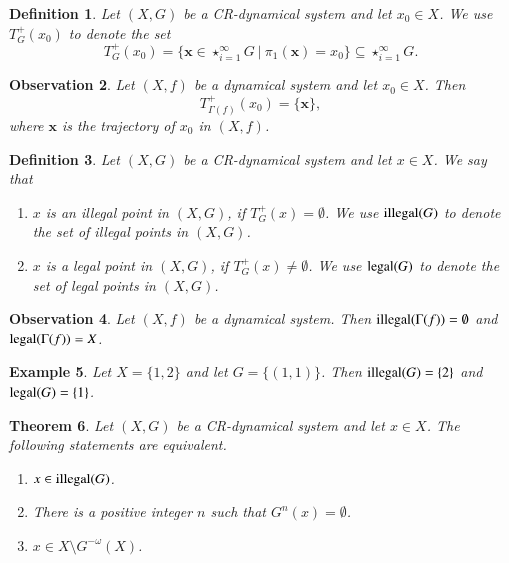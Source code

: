 \documentclass[a4paper,12pt]{article} %
\newcommand{\illegal}{\textup{illegal}}
\newcommand{\legal}{\textup{legal}}
\newtheorem{theorem}{Theorem}[section]
\newtheorem{definition}[theorem]{Definition}
\newtheorem{example}[theorem]{Example}
\newtheorem{observation}[theorem]{Observation}
\begin{document}
\begin{definition}
Let $(X,G)$ be a CR-dynamical system and let $x_0\in X$. We use \emph{ \color{blue}  $T_G^{+}(x_0)$} to denote the set 
$$
T_G^{+}(x_0)=\{\mathbf x\in \star_{i=1}^{\infty}G \ | \  \pi_1(\mathbf x)=x_0\}\subseteq \star_{i=1}^{\infty}G.
$$
\end{definition}
\begin{observation}
Let $(X,f)$ be a dynamical system and let $x_0\in X$.  Then
$$
T_{\Gamma(f)}^{+}(x_0) =\{\mathbf x\},
$$
where $\mathbf x$ is the trajectory of $x_0$ in $(X,f)$.
\end{observation}
\begin{definition}
Let $(X,G)$ be a CR-dynamical system and let $x\in X$. We say that
\begin{enumerate}
\item $x$ is \emph{\color{blue} an illegal point in $(X,G)$}, if $T_G^{+}(x)=\emptyset$. We use 
\emph{\color{blue}$\illegal(G)$} to denote the set of illegal points in $(X,G)$.
\item $x$ is \emph{\color{blue} a legal point in $(X,G)$}, if $T_G^{+}(x)\neq \emptyset$. We use 
\emph{\color{blue}$\legal(G)$} to denote the set of legal points in $(X,G)$.
\end{enumerate}
\end{definition}
\begin{observation}
Let $(X,f)$ be a dynamical system. Then $\illegal(\Gamma(f))=\emptyset$ and $\legal(\Gamma(f))=X$.
\end{observation}
\begin{example}
Let $X=\{1,2\}$ and let $G=\{(1,1)\}$. Then $\illegal(G)=\{2\}$ and $\legal(G)=\{1\}$.
\end{example}
\begin{theorem}\label{main1}
Let $(X,G)$ be a CR-dynamical system and let $x\in X$. The following statements are equivalent.
\begin{enumerate}
\item\label{b1} $x\in \illegal(G)$.
\item\label{b2} There is a positive integer $n$ such that $G^n(x)=\emptyset$.
\item\label{b3} $x\in X\setminus G^{-\omega}(X)$.
\end{enumerate}
\end{theorem}
\end{document}

